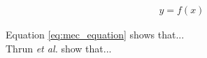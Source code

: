 \begin{align}
\label{eq:mec_equation}
y = f(x)
\end{align}

Equation \ref{eq:mec_equation} shows that...\\
Thrun \emph{et al.} \cite{Thrun} show that... 


